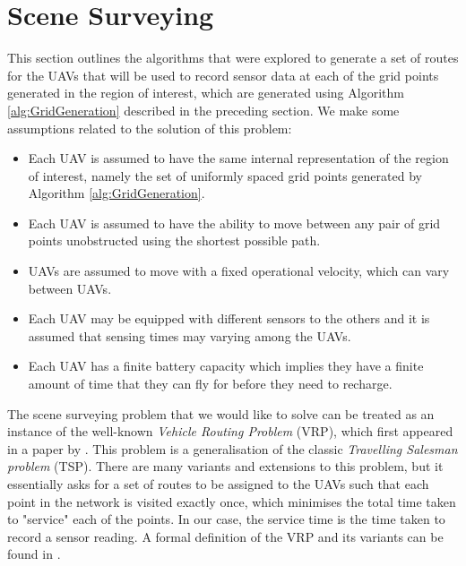 
\section{Scene Surveying}
This section outlines the algorithms that were explored to generate a set of routes for the UAVs that will be used to record sensor data at each of the grid points generated in the region of interest, which are generated using Algorithm \ref{alg:GridGeneration} described in the preceding section. We make some assumptions related to the solution of this problem:
\begin{itemize}
    \item Each UAV is assumed to have the same internal representation of the region of interest, namely the set of uniformly spaced grid points generated by Algorithm \ref{alg:GridGeneration}.
    \item Each UAV is assumed to have the ability to move between any pair of grid points unobstructed using the shortest possible path.
    \item UAVs are assumed to move with a fixed operational velocity, which can vary between UAVs.
    \item Each UAV may be equipped with different sensors to the others and it is assumed that sensing times may varying among the UAVs.
    \item Each UAV has a finite battery capacity which implies they have a finite amount of time that they can fly for before they need to recharge.
\end{itemize}


The scene surveying problem that we would like to solve can be treated as an instance of the well-known \textit{Vehicle Routing Problem} (VRP), which first appeared in a paper by \citeauthor{Dantzig1959TheProblem} \cite{Dantzig1959TheProblem}. This problem is a generalisation of the classic \textit{Travelling Salesman problem} (TSP). There are many variants and extensions to this problem, but it essentially asks for a set of routes to be assigned to the UAVs such that each point in the network is visited exactly once, which minimises the total time taken to "service" each of the points. In our case, the service time is the time taken to record a sensor reading. A formal definition of the VRP and its variants can be found in \cite{Toth2002TheProblem}.


